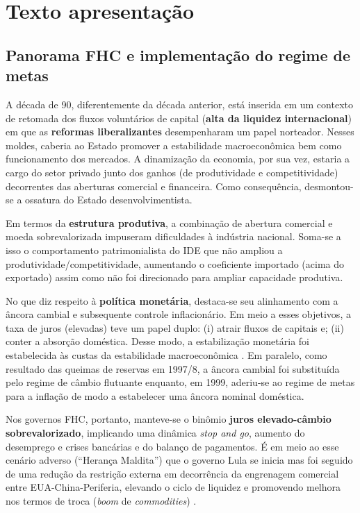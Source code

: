 \documentclass[11pt]{article}
\begin{document}
\section*{Texto apresentação}
\label{sec:org6d3869f}

\subsection*{Panorama FHC e implementação do regime de metas}
\label{sec:org42f5c27}

A década de 90, diferentemente da década anterior, está inserida em um contexto de retomada dos fluxos voluntários de capital (\textbf{alta da liquidez internacional}) em que as \textbf{reformas liberalizantes} desempenharam um papel norteador.
Nesses moldes, caberia ao Estado promover a estabilidade macroeconômica bem como funcionamento dos mercados.
A dinamização da economia, por sua vez, estaria a cargo do setor privado junto dos ganhos (de produtividade e competitividade) decorrentes das aberturas comercial e financeira.
Como consequência, desmontou-se a ossatura do Estado desenvolvimentista.

Em termos da \textbf{estrutura produtiva}, a combinação de abertura comercial e moeda sobrevalorizada impuseram dificuldades à indústria nacional. 
Soma-se a isso o comportamento patrimonialista do IDE que não ampliou a produtividade/competitividade, aumentando o coeficiente importado (acima do exportado) assim como não foi direcionado para ampliar capacidade produtiva. 

No que diz respeito à \textbf{política monetária}, destaca-se seu alinhamento com a âncora cambial e subsequente controle inflacionário. 
Em meio a esses objetivos, a taxa de juros (elevadas) teve um papel duplo:
(i) atrair fluxos de capitais e;
(ii) conter a absorção doméstica.
Desse modo, a estabilização monetária foi estabelecida às custas da estabilidade macroeconômica \cite{belluzzoDepoisQuedaEconomia2002}.
Em paralelo, como resultado das queimas de reservas em 1997/8, a âncora cambial foi substituída pelo regime de câmbio flutuante enquanto, em 1999, aderiu-se ao regime de metas para a inflação de modo a estabelecer uma âncora nominal doméstica.

Nos governos FHC, portanto, manteve-se o binômio \textbf{juros elevado-câmbio sobrevalorizado}, implicando uma dinâmica \emph{stop and go}, aumento do desemprego e crises bancárias e do balanço de pagamentos.
É em meio ao esse cenário adverso (``Herança Maldita'') que o governo Lula se inicia mas foi seguido de uma redução da restrição externa em decorrência da engrenagem comercial entre EUA-China-Periferia, elevando o ciclo de liquidez e promovendo melhora nos termos de troca (\emph{boom} de \emph{commodities}) \cite{carneiroDesenvolvimentoEmCrise2002}. 
\end{document}
